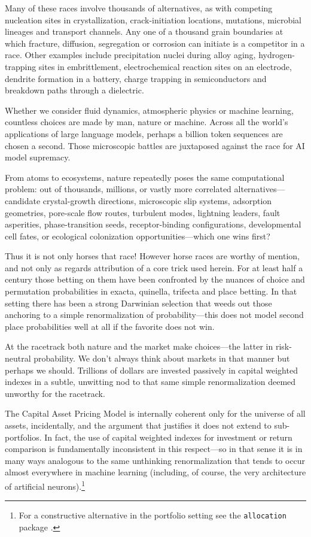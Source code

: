 \documentclass[12pt]{article}
\theoremstyle{remark}
\begin{document}
Many of these races involve thousands of alternatives, as with competing nucleation sites in crystallization, crack-initiation locations, mutations, microbial lineages and
transport channels. Any one of a thousand grain boundaries at which fracture, diffusion, segregation or corrosion can initiate is a competitor in a race. Other examples include
 precipitation nuclei during alloy aging, hydrogen-trapping sites in embrittlement, electrochemical reaction sites on an electrode, dendrite formation in a battery, charge trapping in
 semiconductors and breakdown paths through a dielectric. 
 
Whether we consider fluid dynamics, atmospheric physics or machine learning, countless choices are made by man, nature or machine. Across all the world's applications
of large language models, perhaps a billion token sequences are chosen a second. Those microscopic battles are juxtaposed against the race
for AI model supremacy. 

From atoms to ecosystems, nature repeatedly poses the same computational problem: out of thousands, millions, or vastly more correlated alternatives—candidate crystal-growth directions, microscopic slip systems, adsorption geometries, pore-scale flow routes, turbulent modes, lightning leaders, fault asperities, phase-transition seeds, receptor-binding configurations, developmental cell fates, or ecological colonization opportunities—which one wins first?

Thus it is not only horses that race! However horse races are worthy of mention, and not only as regards attribution of a core trick used herein. For at least half a century those betting on them have been confronted by the nuances of choice and permutation probabilities in exacta, quinella, trifecta and place betting. In that setting there has been a strong Darwinian selection that weeds out those anchoring to a simple renormalization of probability---this does not model second place probabilities well at all if the favorite does not win.  

At the racetrack both nature and the market make choices---the latter in risk-neutral probability. We don't always think about markets in that manner but perhaps we should. 
Trillions of dollars are invested passively in capital weighted indexes in a subtle, unwitting nod to that same simple renormalization deemed unworthy for the racetrack.  

The Capital Asset Pricing Model is internally coherent only for the universe of all assets, incidentally, and the argument that justifies it does not extend to sub-portfolios. In fact, the 
use of capital weighted indexes for investment or return comparison is fundamentally inconsistent in this respect---so in that sense it is in many ways analogous to the same 
unthinking renormalization that tends to occur almost everywhere in machine learning (including, of course, the very architecture of artificial neurons).\footnote{For a constructive alternative in the portfolio setting see the \texttt{allocation} package \citep{allocationpkg}.}    
\end{document}
